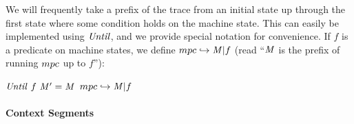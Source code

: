 \documentclass[acmsmall,review,anonymous]{acmart}\settopmatter{printfolios=true,printccs=false,printacmref=false}
\begin{document}
We will frequently take a prefix of the trace from an initial state up
through the first state where some condition holds on the machine state.
This can easily be implemented using \(\mathit{Until}\), and we provide special notation
for convenience.
%
If \(f\) is a predicate on machine states, we define \(mpc
\hookrightarrow \mathit{M} | f\) (read ``\(\mathit{M}\) is the prefix of
running \(mpc\) up to \(f\)''):
%
\begin{center}
            {\(\mathit{Until} ~ f ~ \mathit{M}' = \mathit{M}\)}
            {\(mpc \hookrightarrow \mathit{M} | f\)}
\end{center}

\vspace*{-\medskipamount}

\paragraph*{Context Segments}
\end{document}
